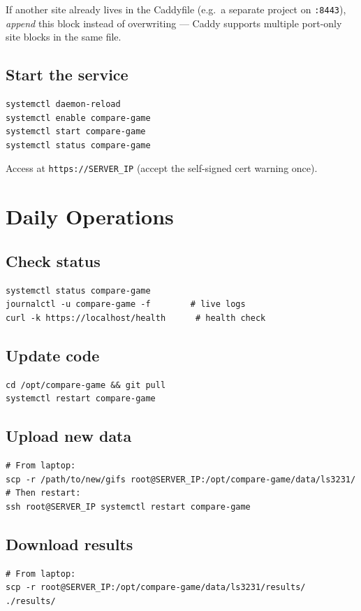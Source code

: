 \documentclass[11pt]{article}
\begin{document}
If another site already lives in the Caddyfile (e.g.\ a separate project on \texttt{:8443}), \emph{append} this block instead of overwriting --- Caddy supports multiple port-only site blocks in the same file.

\subsection{Start the service}

\begin{lstlisting}
systemctl daemon-reload
systemctl enable compare-game
systemctl start compare-game
systemctl status compare-game
\end{lstlisting}

Access at \texttt{https://SERVER\_IP} (accept the self-signed cert warning once).

\section{Daily Operations}

\subsection{Check status}
\begin{lstlisting}
systemctl status compare-game
journalctl -u compare-game -f        # live logs
curl -k https://localhost/health      # health check
\end{lstlisting}

\subsection{Update code}
\begin{lstlisting}
cd /opt/compare-game && git pull
systemctl restart compare-game
\end{lstlisting}

\subsection{Upload new data}
\begin{lstlisting}
# From laptop:
scp -r /path/to/new/gifs root@SERVER_IP:/opt/compare-game/data/ls3231/
# Then restart:
ssh root@SERVER_IP systemctl restart compare-game
\end{lstlisting}

\subsection{Download results}
\begin{lstlisting}
# From laptop:
scp -r root@SERVER_IP:/opt/compare-game/data/ls3231/results/ ./results/
\end{lstlisting}
\end{document}
